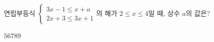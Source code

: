 연립부등식 $\begin{cases} 3x-1\le x+a \\ 2x+3\le 3x+1 \end{cases}$의 해가 $2\le x\le 4$일 때, 상수 $a$의 값은?
\begin{choices32}{$5$}{$6$}{$7$}{$8$}{$9$}\end{choices32}

